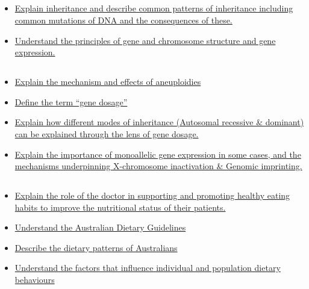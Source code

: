 \documentclass[10pt, a4paper]{article}
\newcommand{\MYhref}[3][blue]{\href{#2}{\color{#1}{#3}}}%
\begin{document}
\subsection{\MYhref[melbBlue]{https://notion.so/fa9bda6f4fe44b32b9c6ad799b70fc44}{Regulation of gene expression}} \begin{itemize} \item \href{https://www.notion.so/3fce9bbb97fe4d1eadaabf277da82a16}{Explain inheritance and describe common patterns of inheritance including common mutations of DNA and the consequences of these.} \item \href{https://www.notion.so/c08c0f9b397b446e859b4c16c43d8ebf}{Understand the principles of gene and chromosome structure and gene expression.} \end{itemize}
\subsection{\MYhref[melbBlue]{https://notion.so/386df7e75176431d87cb79664c6a24a1}{Gene Dosage and Genomic Imprinting}} \begin{itemize} \item \href{https://www.notion.so/368af7e928214a478e50e03d8b9aa5ba}{Explain the mechanism and effects of aneuploidies} \item \href{https://www.notion.so/3a838d4683164397a42529e0dbb628ab}{Define the term “gene dosage”} \item \href{https://www.notion.so/f324a315650e4efb8d5dcd147f59c4e3}{Explain how different modes of inheritance (Autosomal recessive \& dominant) can be explained through the lens of gene dosage.} \item \href{https://www.notion.so/2860c3d39dfa4198a6e90b8550a2eb98}{Explain the importance of monoallelic gene expression in some cases, and the mechanisms underpinning X-chromosome inactivation \& Genomic imprinting. } \end{itemize}
\subsection{\MYhref[melbBlue]{https://notion.so/473e02c29c4c43b9b3b060f07ebbab46}{Food and Nutrition 101}} \begin{itemize} \item \href{https://www.notion.so/5c841682592643f0a023819dc3c0ade3}{Explain the role of the doctor in supporting and promoting healthy eating habits to improve the nutritional status of their patients.} \item \href{https://www.notion.so/e262bae670d346a5a770b5842bf92928}{Understand the Australian Dietary Guidelines} \item \href{https://www.notion.so/a9eba380011c4742b8044c0ec9fc8882}{Describe the dietary patterns of Australians} \item \href{https://www.notion.so/2345f8f6485347d88362a87b12ed3f4a}{Understand the factors that influence individual and population dietary behaviours} \end{itemize}
\end{document}
